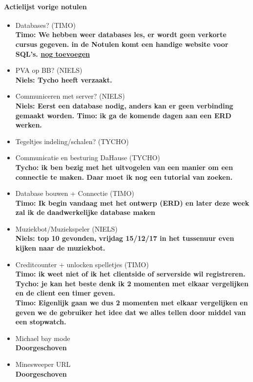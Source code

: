\documentclass[11pt]{article}
\begin{document}
\paragraph{Actielijst vorige notulen}
\begin{itemize}
\item Databases? (TIMO)\\
\textbf{Timo: We hebben weer databases les, er wordt geen verkorte cursus gegeven. in de Notulen komt een handige website voor SQL's.
\url{nog toevoegen} }
\item PVA op BB? (NIELS)\\
\textbf{Niels: Tycho heeft verzaakt.}
\item Communiceren met server? (NIELS)\\
\textbf{Niels: Eerst een database nodig, anders kan er geen verbinding gemaakt worden. Timo: ik ga de komende dagen aan een ERD werken. }
\item Tegeltjes indeling/schalen? (TYCHO)\\
\item Communicatie en besturing DaHause (TYCHO)\\
\textbf{Tycho: ik ben bezig met het uitvogelen van een manier om een connectie te maken. Daar moet ik nog een tutorial van zoeken.}
\item Database bouwen + Connectie (TIMO)\\
\textbf{Timo: Ik begin vandaag met het ontwerp (ERD) en later deze week zal ik de daadwerkelijke database maken}
\item Muziekbot/Muziekspeler (NIELS)\\
\textbf{Niels: top 10 gevonden, vrijdag 15/12/17 in het tussenuur even kijken naar de muziekbot.}
\item Creditcounter + unlocken spelletjes (TIMO)\\
\textbf{Timo: ik weet niet of ik het clientside of serverside wil registreren.\\
Tycho: je kan het beste denk ik 2 momenten met elkaar vergelijken en de client een timer geven.\\
Timo: Eigenlijk gaan we dus 2 momenten met elkaar vergelijken en geven we de gebruiker het idee dat we alles tellen door middel van een stopwatch.}

\item Michael bay mode\\
\textbf{Doorgeschoven}
\item Minesweeper URL\\
\textbf{Doorgeschoven}
\end{itemize}
\end{document}
